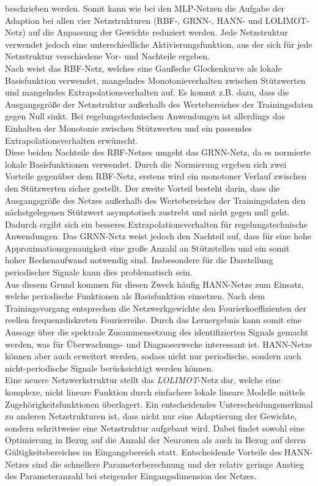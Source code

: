 beschrieben werden. Somit kann wie bei den MLP-Netzen die Aufgabe der Adaption bei allen vier Netzstrukturen (RBF-, GRNN-, HANN- und LOLIMOT-Netz) auf die Anpassung der Gewichte reduziert werden. Jede Netzstruktur verwendet jedoch eine unterschiedliche Aktivierungsfunktion, aus der sich für jede Netzstruktur verschiedene Vor- und Nachteile ergeben. \\

Nach \cite{Schroder.2010} weist das RBF-Netz, welches eine Gaußsche Glockenkurve als lokale Basisfunktion verwendet, mangelndes Monotonieverhalten zwischen Stützwerten und mangelndes Extrapolationsverhalten auf. Es kommt z.B. dazu, dass die Ausgangsgröße der Netzstruktur außerhalb des Wertebereiches der Trainingsdaten gegen Null sinkt. Bei regelungstechnischen Anwendungen ist allerdings das Einhalten der Monotonie zwischen Stützwerten und ein passendes Extrapolationsverhalten erwünscht. \cite{Schroder.2010} \\ 
Diese beiden Nachteile des RBF-Netzes umgeht das GRNN-Netz, da es normierte lokale Basisfunktionen verwendet. Durch die Normierung ergeben sich zwei Vorteile gegenüber dem RBF-Netz, erstens wird ein monotoner Verlauf zwischen den Stützwerten sicher gestellt. Der zweite Vorteil besteht darin, dass die Ausgangsgröße des Netzes außerhalb des Wertebereiches der Trainingsdaten den nächstgelegenen Stützwert asymptotisch zustrebt und nicht gegen null geht. Dadurch ergibt sich ein besseres Extrapolationsverhalten für regelungstechnische Anwendungen. Das GRNN-Netz weist jedoch den Nachteil auf, dass für eine hohe Approximationsgenauigkeit eine große Anzahl an Stützstellen und ein somit hoher Rechenaufwand notwendig sind. Insbesondere für die Darstellung periodischer Signale kann dies problematisch sein. \cite{Schroder.2010} \\
 Aus diesem Grund kommen für diesen Zweck häufig HANN-Netze zum Einsatz, welche periodische Funktionen als Basisfunktion einsetzen. Nach dem Trainingsvorgang entsprechen die Netzwerkgewichte den Fourierkoeffizienten der reellen frequenzdiskreten Fourierreihe. Durch das Lernergebnis kann somit eine Aussage über die spektrale Zusammensetzung des identifizierten Signals gemacht werden, was für Überwachungs- und Diagnosezwecke interessant ist. HANN-Netze können aber auch erweitert werden, sodass nicht nur periodische, sondern auch nicht-periodische Signale berücksichtigt werden können. \cite{Schroder.2010} \\  
 Eine neuere Netzwerkstruktur stellt das \textit{LOLIMOT}-Netz dar, welche eine komplexe, nicht lineare Funktion durch einfachere lokale lineare Modelle mittels Zugehörigkeitsfunktionen überlagert. Ein entscheidendes Unterscheidungsmerkmal zu anderen Netzstrukturen ist, dass nicht nur eine Adaptierung der Gewichte, sondern schrittweise eine Netzstruktur aufgebaut wird. Dabei findet sowohl eine Optimierung in Bezug auf die Anzahl der Neuronen als auch in Bezug auf deren Gültigkeitsbereiches im Eingangsbereich statt. Entscheidende Vorteile des HANN-Netzes sind die schnellere Parameterberechnung und der relativ geringe Anstieg des Parameteranzahl bei steigender Eingangsdimension des Netzes. \cite{Schroder.2010} 


